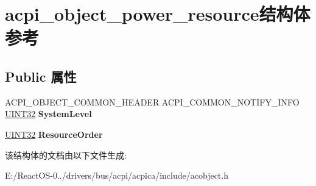 \hypertarget{structacpi__object__power__resource}{}\section{acpi\+\_\+object\+\_\+power\+\_\+resource结构体 参考}
\label{structacpi__object__power__resource}
\subsection*{Public 属性}
\begin{DoxyCompactItemize}
\item 
\mbox{\label{structacpi__object__power__resource_afb350dc26a0749dca9d729475061e841}} 
A\+C\+P\+I\+\_\+\+O\+B\+J\+E\+C\+T\+\_\+\+C\+O\+M\+M\+O\+N\+\_\+\+H\+E\+A\+D\+ER A\+C\+P\+I\+\_\+\+C\+O\+M\+M\+O\+N\+\_\+\+N\+O\+T\+I\+F\+Y\+\_\+\+I\+N\+FO \hyperlink{_processor_bind_8h_ae1e6edbbc26d6fbc71a90190d0266018}{U\+I\+N\+T32} {\bfseries System\+Level}
\item 
\mbox{\label{structacpi__object__power__resource_a07ffa374248062fae166d788871a2408}} 
\hyperlink{_processor_bind_8h_ae1e6edbbc26d6fbc71a90190d0266018}{U\+I\+N\+T32} {\bfseries Resource\+Order}
\end{DoxyCompactItemize}


该结构体的文档由以下文件生成\+:\begin{DoxyCompactItemize}
\item 
E\+:/\+React\+O\+S-\/0../drivers/bus/acpi/acpica/include/acobject.\+h\end{DoxyCompactItemize}
